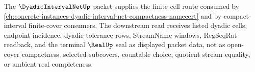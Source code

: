 The $\DyadicIntervalNetUp$ packet supplies the finite cell route consumed by \autoref{ch:concrete-instances-dyadic-interval-net-compactness-namecert} and by compact-interval finite-cover consumers. The downstream read receives listed dyadic cells, endpoint incidence, dyadic tolerance rows, StreamName windows, RegSeqRat readback, and the terminal $\RealUp$ seal as displayed packet data, not as open-cover compactness, selected subcovers, countable choice, quotient stream equality, or ambient real completeness.
